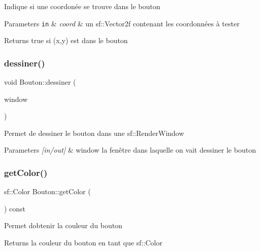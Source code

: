 Indique si une coordonée se trouve dans le bouton 
\begin{DoxyParams}[1]{Parameters}
\mbox{\tt in}  & {\em coord} & un sf\+::\+Vector2f contenant les coordonnées à tester \\
\hline
\end{DoxyParams}
\begin{DoxyReturn}{Returns}
true si (x,y) est dans le bouton 
\end{DoxyReturn}
\mbox{\label{classBouton_a57bd7f1865b5d3f698a5a02c92556697}} 
\subsubsection{\texorpdfstring{dessiner()}{dessiner()}}
{\footnotesize\ttfamily void Bouton\+::dessiner (\begin{DoxyParamCaption}\item[{sf\+::\+Render\+Window \&}]{window }\end{DoxyParamCaption})}

Permet de dessiner le bouton dans une sf\+::\+Render\+Window 
\begin{DoxyParams}{Parameters}
{\em \mbox{[}in/out\mbox{]}} & window la fenêtre dans laquelle on vait dessiner le bouton \\
\hline
\end{DoxyParams}
\mbox{\label{classBouton_af6646f95d000b61b576747235d0ea665}} 
\subsubsection{\texorpdfstring{get\+Color()}{getColor()}}
{\footnotesize\ttfamily sf\+::\+Color Bouton\+::get\+Color (\begin{DoxyParamCaption}{ }\end{DoxyParamCaption}) const}

Permet d\textquotesingle{}obtenir la couleur du bouton \begin{DoxyReturn}{Returns}
la couleur du bouton en tant que sf\+::\+Color 
\end{DoxyReturn}
\mbox{\label{classBouton_a496926e39e87be5f946b4c1b53accd21}} 

